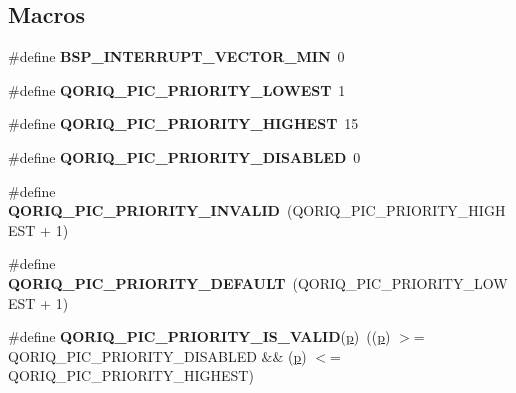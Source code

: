 \subsection*{Macros}
\begin{DoxyCompactItemize}
\item 
\mbox{\label{group__RTEMSBSPsPowerPCQorIQInterrupt_ga64cbb02dfea4d6923abccaa0087d2a0d}} 
\#define {\bfseries B\+S\+P\+\_\+\+I\+N\+T\+E\+R\+R\+U\+P\+T\+\_\+\+V\+E\+C\+T\+O\+R\+\_\+\+M\+IN}~0
\item 
\mbox{\label{group__RTEMSBSPsPowerPCQorIQInterrupt_ga2f5b5ae701dea8c2d5f110f43e4a7d95}} 
\#define {\bfseries Q\+O\+R\+I\+Q\+\_\+\+P\+I\+C\+\_\+\+P\+R\+I\+O\+R\+I\+T\+Y\+\_\+\+L\+O\+W\+E\+ST}~1
\item 
\mbox{\label{group__RTEMSBSPsPowerPCQorIQInterrupt_gad2362c382ee0ad84481e4729325850d3}} 
\#define {\bfseries Q\+O\+R\+I\+Q\+\_\+\+P\+I\+C\+\_\+\+P\+R\+I\+O\+R\+I\+T\+Y\+\_\+\+H\+I\+G\+H\+E\+ST}~15
\item 
\mbox{\label{group__RTEMSBSPsPowerPCQorIQInterrupt_gad15a39e5f18122024d6ae6a66b1d27e6}} 
\#define {\bfseries Q\+O\+R\+I\+Q\+\_\+\+P\+I\+C\+\_\+\+P\+R\+I\+O\+R\+I\+T\+Y\+\_\+\+D\+I\+S\+A\+B\+L\+ED}~0
\item 
\mbox{\label{group__RTEMSBSPsPowerPCQorIQInterrupt_gaa1689cd4dfc9748409e905a2941e625a}} 
\#define {\bfseries Q\+O\+R\+I\+Q\+\_\+\+P\+I\+C\+\_\+\+P\+R\+I\+O\+R\+I\+T\+Y\+\_\+\+I\+N\+V\+A\+L\+ID}~(Q\+O\+R\+I\+Q\+\_\+\+P\+I\+C\+\_\+\+P\+R\+I\+O\+R\+I\+T\+Y\+\_\+\+H\+I\+G\+H\+E\+ST + 1)
\item 
\mbox{\label{group__RTEMSBSPsPowerPCQorIQInterrupt_ga0e3002590f585996f5c0a851a76ab1c2}} 
\#define {\bfseries Q\+O\+R\+I\+Q\+\_\+\+P\+I\+C\+\_\+\+P\+R\+I\+O\+R\+I\+T\+Y\+\_\+\+D\+E\+F\+A\+U\+LT}~(Q\+O\+R\+I\+Q\+\_\+\+P\+I\+C\+\_\+\+P\+R\+I\+O\+R\+I\+T\+Y\+\_\+\+L\+O\+W\+E\+ST + 1)
\item 
\mbox{\label{group__RTEMSBSPsPowerPCQorIQInterrupt_ga7e6a088c70b44dc7d7a758ec429514d4}} 
\#define {\bfseries Q\+O\+R\+I\+Q\+\_\+\+P\+I\+C\+\_\+\+P\+R\+I\+O\+R\+I\+T\+Y\+\_\+\+I\+S\+\_\+\+V\+A\+L\+ID}(\mbox{\hyperlink{sun4u_2tte_8h_a27952ffc298d15b4fc0e7ee6b2a044ac}{p}})~((\mbox{\hyperlink{sun4u_2tte_8h_a27952ffc298d15b4fc0e7ee6b2a044ac}{p}}) $>$= Q\+O\+R\+I\+Q\+\_\+\+P\+I\+C\+\_\+\+P\+R\+I\+O\+R\+I\+T\+Y\+\_\+\+D\+I\+S\+A\+B\+L\+ED \&\& (\mbox{\hyperlink{sun4u_2tte_8h_a27952ffc298d15b4fc0e7ee6b2a044ac}{p}}) $<$= Q\+O\+R\+I\+Q\+\_\+\+P\+I\+C\+\_\+\+P\+R\+I\+O\+R\+I\+T\+Y\+\_\+\+H\+I\+G\+H\+E\+ST)
\end{DoxyCompactItemize}
